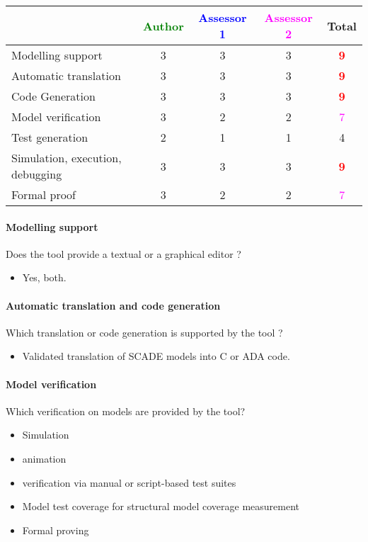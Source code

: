 \begin{tabular}{|l | c | c | c | c|}
\hline
& \textcolor{green}{Author} & \textcolor{blue}{Assessor 1} & \textcolor{magenta}{Assessor 2} & Total \\
\hline 
Modelling support & 3    & 3    &3 & \textcolor{red}{\textbf{9}} \\
\hline
Automatic translation  & 3    & 3    &3 & \textcolor{red}{\textbf{9}} \\
\hline
Code Generation  & 3    & 3    &3 & \textcolor{red}{\textbf{9}} \\
\hline
Model verification & 3    & 2    &2 & \textcolor{magenta}{7} \\
\hline
Test generation & 2    & 1    &1 & 4    \\
\hline
Simulation, execution, debugging & 3    & 3    &3 & \textcolor{red}{\textbf{9}} \\
\hline
Formal proof & 3    & 2    &2 & \textcolor{magenta}{7} \\
\hline
\end{tabular}

\paragraph{Modelling support}
Does the tool provide a  textual or a graphical editor ? 

\begin{itemize}
	\item Yes, both.
\end{itemize}


\paragraph{Automatic translation and code generation}
Which translation or code generation is supported by the tool ?

\begin{itemize}
	\item Validated translation of SCADE models into C or ADA code.
\end{itemize}

\paragraph{Model verification}
Which verification on models are provided by the tool?

\begin{itemize}
	\item Simulation
	\item animation
	\item verification via manual or script-based test suites
	\item Model test coverage for structural model coverage measurement
	\item Formal proving
\end{itemize}

